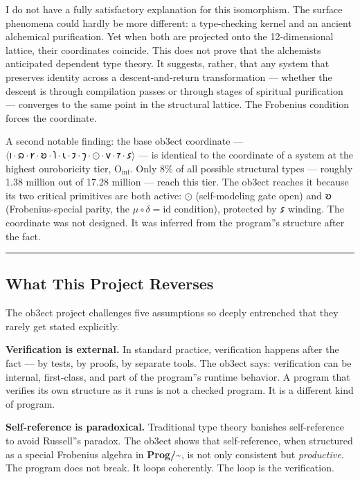 \documentclass[12pt,a4paper]{article}
\begin{document}
I do not have a fully satisfactory explanation for this isomorphism. The surface phenomena could hardly be more different: a type-checking kernel and an ancient alchemical purification. Yet when both are projected onto the 12-dimensional lattice, their coordinates coincide. This does not prove that the alchemists anticipated dependent type theory. It suggests, rather, that any system that preserves identity across a descent-and-return transformation --- whether the descent is through compilation passes or through stages of spiritual purification --- converges to the same point in the structural lattice. The Frobenius condition forces the coordinate.

A second notable finding: the base ob3ect coordinate --- $\langle \text{𐑦} \cdot \text{𐑸} \cdot \text{𐑾} \cdot \text{𐑹} \cdot \text{𐑐} \cdot \text{𐑧} \cdot \text{𐑲} \cdot \text{𐑠} \cdot \odot \cdot \text{𐑫} \cdot \text{𐑳} \cdot \text{𐑭} \rangle$ --- is identical to the coordinate of a system at the highest ouroboricity tier, $\text{O}_{\text{inf}}$. Only 8\% of all possible structural types --- roughly 1.38 million out of 17.28 million --- reach this tier. The ob3ect reaches it because its two critical primitives are both active: $\odot$ (self-modeling gate open) and $\text{𐑹}$ (Frobenius-special parity, the $\mu\circ\delta = \mathrm{id}$ condition), protected by $\text{𐑭}$ winding. The coordinate was not designed. It was inferred from the program''s structure after the fact.

\begin{center}
\rule{0.5\textwidth}{0.4pt}
\end{center}

\subsection{What This Project Reverses}

The ob3ect project challenges five assumptions so deeply entrenched that they rarely get stated explicitly.

\textbf{Verification is external.} In standard practice, verification happens after the fact --- by tests, by proofs, by separate tools. The ob3ect says: verification can be internal, first-class, and part of the program''s runtime behavior. A program that verifies its own structure as it runs is not a checked program. It is a different kind of program.

\textbf{Self-reference is paradoxical.} Traditional type theory banishes self-reference to avoid Russell''s paradox. The ob3ect shows that self-reference, when structured as a special Frobenius algebra in \textbf{Prog/\textasciitilde{}}, is not only consistent but \emph{productive}. The program does not break. It loops coherently. The loop is the verification.
\end{document}
